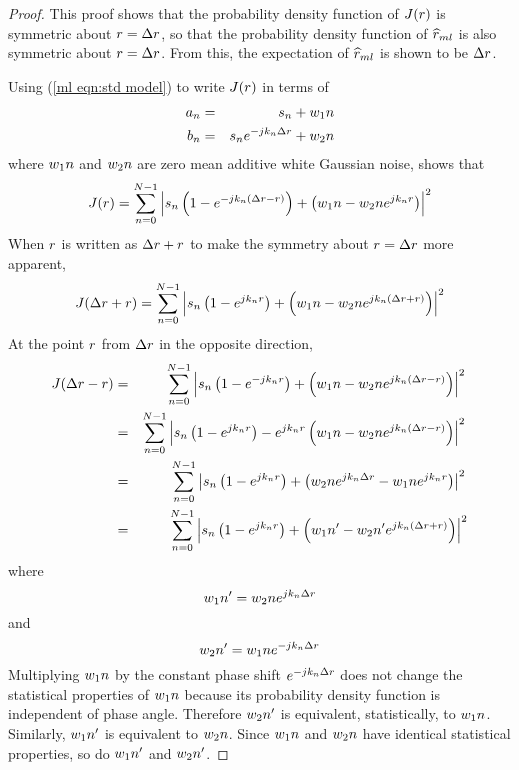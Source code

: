 \begin{proof}
This proof shows that the probability density function of $J({r})$ is
symmetric about ${r}={\Delta r}$, so that the probability density function of
$\widehat{r}_{ml}$ is also symmetric about ${r}={\Delta r}$.  From this, the expectation of
$\widehat{r}_{ml}$ is shown to be ${\Delta r}$.

Using (\ref{ml eqn:std model}) to write $J({r})$ in terms of
\begin{eqnarray}
a_n&=&s_n+{w_1}{n}{\nonumber}\\
b_n&=&s_n{e^{-jk_n{\Delta r}}}+{w_2}{n}    
\label{sp eqn:std model}
\end{eqnarray}
where ${w_1}{n}$ and ${w_2}{n}$ are zero mean additive white Gaussian noise,
shows that
\begin{equation}
J({r})=\sum_{n=0}^{N-1} \left|s_n\left(1-{e^{-jk_n({\Delta r}-{r})}}\right)
+\left({w_1}{n}-{w_2}{n}{e^{jk_n{r}}}\right)\right|^2
\end{equation}
When ${r}$ is written as ${\Delta r}+{r}$ to make the symmetry about ${r}={\Delta r}$ more
apparent,
\begin{equation}
\label{sp eqn:J(dr+r)}
J({\Delta r}+{r})=\sum_{n=0}^{N-1} \left|s_n\left(1-{e^{jk_n{r}}}\right)
+\left({w_1}{n}-{w_2}{n}{e^{jk_n({\Delta r}+{r})}}\right)\right|^2
\end{equation}
At the point ${r}$ from ${\Delta r}$ in the opposite direction,
\begin{eqnarray}
J({\Delta r}-{r})
&=&\sum_{n=0}^{N-1} \left|s_n\left(1-{e^{-jk_n{r}}}\right)
+\left({w_1}{n}-{w_2}{n}{e^{jk_n({\Delta r}-{r})}}\right)\right|^2{\nonumber}\\
&=&\sum_{n=0}^{N-1} \left|s_n\left(1-{e^{jk_n{r}}}\right)
-{e^{jk_n{r}}}\left({w_1}{n}-{w_2}{n}{e^{jk_n({\Delta r}-{r})}}\right)\right|^2{\nonumber}\\
&=&\sum_{n=0}^{N-1} \left|s_n\left(1-{e^{jk_n{r}}}\right)
+\left({w_2}{n}{e^{jk_n{\Delta r}}}-{w_1}{n}{e^{jk_n{r}}}\right)\right|^2{\nonumber}\\
&=&\sum_{n=0}^{N-1} \left|s_n\left(1-{e^{jk_n{r}}}\right)
+\left({w_1}{n}'-{w_2}{n}'{e^{jk_n({\Delta r}+{r})}}\right)\right|^2
\label{sp eqn:J(dr-r)}
\end{eqnarray}
where
\begin{equation}
{w_1}{n}'={w_2}{n}{e^{jk_n{\Delta r}}}
\end{equation}
and
\begin{equation}
{w_2}{n}'={w_1}{n}{e^{-jk_n{\Delta r}}}
\end{equation}
Multiplying ${w_1}{n}$ by the constant phase shift ${e^{-jk_n{\Delta r}}}$ does not
change the statistical properties of ${w_1}{n}$ because its probability
density function is independent of phase angle.  Therefore ${w_2}{n}'$ is
equivalent, statistically, to ${w_1}{n}$.  Similarly, ${w_1}{n}'$ is equivalent
to ${w_2}{n}$.  Since ${w_1}{n}$ and ${w_2}{n}$ have identical statistical
properties, so do ${w_1}{n}'$ and ${w_2}{n}'$.  


\end{proof}
